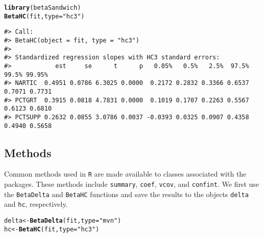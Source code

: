 \documentclass[man]{apa7}\usepackage[]{graphicx}\usepackage[]{xcolor}
\makeatletter
\newcommand{\hlstr}[1]{\textcolor[rgb]{0.192,0.494,0.8}{#1}}%
\newcommand{\hlstd}[1]{\textcolor[rgb]{0.345,0.345,0.345}{#1}}%
\newcommand{\hlkwb}[1]{\textcolor[rgb]{0.69,0.353,0.396}{#1}}%
\newcommand{\hlkwc}[1]{\textcolor[rgb]{0.333,0.667,0.333}{#1}}%
\newcommand{\hlkwd}[1]{\textcolor[rgb]{0.737,0.353,0.396}{\textbf{#1}}}%
\newenvironment{kframe}{%
 \def\at@end@of@kframe{}%
 \ifinner\ifhmode%
  \def\at@end@of@kframe{\end{minipage}}%
  \begin{minipage}{\columnwidth}%
 \fi\fi%
 \def\FrameCommand##1{\hskip\@totalleftmargin \hskip-\fboxsep
 \colorbox{shadecolor}{##1}\hskip-\fboxsep
     \hskip-\linewidth \hskip-\@totalleftmargin \hskip\columnwidth}%
 \MakeFramed {\advance\hsize-\width
   \@totalleftmargin\z@ \linewidth\hsize
   \@setminipage}}%
 {\par\unskip\endMakeFramed%
 \at@end@of@kframe}
\newenvironment{knitrout}{}{} %
\makeatother
\begin{document}
\vspace{-.5em}
\begin{minipage}{.75\linewidth}
	\singlespacing
\begin{knitrout}\scriptsize
{}\color{fgcolor}\begin{kframe}
\begin{alltt}
\hlkwd{library}\hlstd{(betaSandwich)}
\hlkwd{BetaHC}\hlstd{(fit,} \hlkwc{type} \hlstd{=} \hlstr{"hc3"}\hlstd{)}
\end{alltt}
\begin{verbatim}
#> Call:
#> BetaHC(object = fit, type = "hc3")
#>
#> Standardized regression slopes with HC3 standard errors:
#>            est     se      t      p   0.05%   0.5%   2.5%  97.5%  99.5% 99.95%
#> NARTIC  0.4951 0.0786 6.3025 0.0000  0.2172 0.2832 0.3366 0.6537 0.7071 0.7731
#> PCTGRT  0.3915 0.0818 4.7831 0.0000  0.1019 0.1707 0.2263 0.5567 0.6123 0.6810
#> PCTSUPP 0.2632 0.0855 3.0786 0.0037 -0.0393 0.0325 0.0907 0.4358 0.4940 0.5658
\end{verbatim}
\end{kframe}
\end{knitrout}
\end{minipage}

\subsection{Methods}

Common methods used in \texttt{R} are made available
to classes associated with the packages.
These methods include
\texttt{summary},
\texttt{coef},
\texttt{vcov}, and
\texttt{confint}.
We first use the
\texttt{BetaDelta}
and
\texttt{BetaHC}
functions and save the results to the objects
\texttt{delta}
and
\texttt{hc},
respectively.

\vspace{-.5em}
\begin{minipage}{.75\linewidth}
	\singlespacing
\begin{knitrout}\scriptsize
{}\color{fgcolor}\begin{kframe}
\begin{alltt}
\hlstd{delta} \hlkwb{<-} \hlkwd{BetaDelta}\hlstd{(fit,} \hlkwc{type} \hlstd{=} \hlstr{"mvn"}\hlstd{)}
\hlstd{hc} \hlkwb{<-} \hlkwd{BetaHC}\hlstd{(fit,} \hlkwc{type} \hlstd{=} \hlstr{"hc3"}\hlstd{)}
\end{alltt}
\end{kframe}
\end{knitrout}
\end{minipage}
\end{document}
